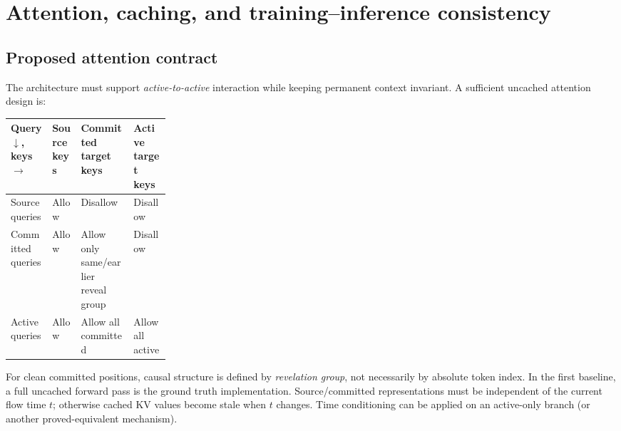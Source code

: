\documentclass[11pt,a4paper]{article}
\begin{document}
\section{Attention, caching, and training--inference consistency}\label{sec:cache}
\subsection{Proposed attention contract}
The architecture must support \emph{active-to-active} interaction while keeping permanent context invariant. A sufficient uncached attention design is:
\begin{center}
\begin{tabularx}{\linewidth}{@{}p{0.26\linewidth}XXX@{}}\toprule
Query $\downarrow$, keys $\rightarrow$ & Source keys & Committed target keys & Active target keys \\ \midrule
Source queries & Allow & Disallow & Disallow \\
Committed queries & Allow & Allow only same/earlier reveal group & Disallow \\
Active queries & Allow & Allow all committed & Allow all active \\ \bottomrule
\end{tabularx}
\end{center}
For clean committed positions, causal structure is defined by \emph{revelation group}, not necessarily by absolute token index. In the first baseline, a full uncached forward pass is the ground truth implementation. Source/committed representations must be independent of the current flow time $t$; otherwise cached KV values become stale when $t$ changes. Time conditioning can be applied on an active-only branch (or another proved-equivalent mechanism).
\end{document}
